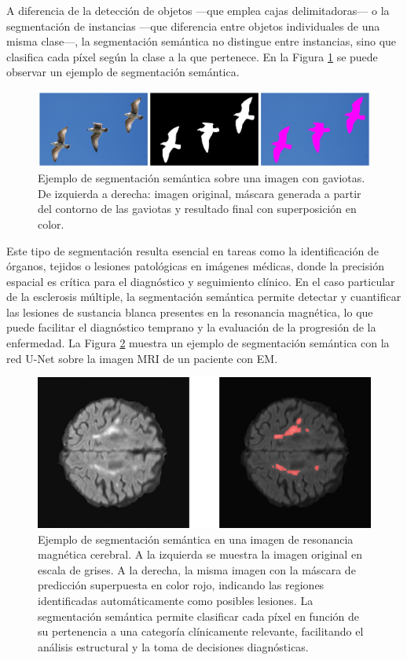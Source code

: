 \documentclass[../main.tex]{subfiles}
\begin{document}
A diferencia de la detección de objetos —que emplea cajas delimitadoras— o la segmentación de instancias —que diferencia entre objetos individuales de una misma clase—, la segmentación semántica no distingue entre instancias, sino que clasifica cada píxel según la clase a la que pertenece. En la Figura \ref{fig:segmentacion_semantica} se puede observar un ejemplo de segmentación semántica.

\begin{figure}
    \centering
    \includegraphics[width=0.7\linewidth]{imgs/fundamentos/segmentacion_semantica.png}
    \caption{Ejemplo de segmentación semántica sobre una imagen con gaviotas. De izquierda a derecha: imagen original, máscara generada a partir del contorno de las gaviotas y resultado final con superposición en color.}
    \label{fig:segmentacion_semantica}
\end{figure}

Este tipo de segmentación resulta esencial en tareas como la identificación de órganos, tejidos o lesiones patológicas en imágenes médicas, donde la precisión espacial es crítica para el diagnóstico y seguimiento clínico. En el caso particular de la esclerosis múltiple, la segmentación semántica permite detectar y cuantificar las lesiones de sustancia blanca presentes en la resonancia magnética, lo que puede facilitar el diagnóstico temprano y la evaluación de la progresión de la enfermedad. La Figura \ref{fig:segmentacion_mri} muestra un ejemplo de segmentación semántica con la red U-Net sobre la imagen MRI de un paciente con EM.

\begin{figure}
    \centering
    \includegraphics[width=0.7\linewidth]{imgs/fundamentos/segmentacion_mri.png}
    \caption{Ejemplo de segmentación semántica en una imagen de resonancia magnética cerebral. A la izquierda se muestra la imagen original en escala de grises. A la derecha, la misma imagen con la máscara de predicción superpuesta en color rojo, indicando las regiones identificadas automáticamente como posibles lesiones. La segmentación semántica permite clasificar cada píxel en función de su pertenencia a una categoría clínicamente relevante, facilitando el análisis estructural y la toma de decisiones diagnósticas.}
    \label{fig:segmentacion_mri}
\end{figure}
\end{document}
